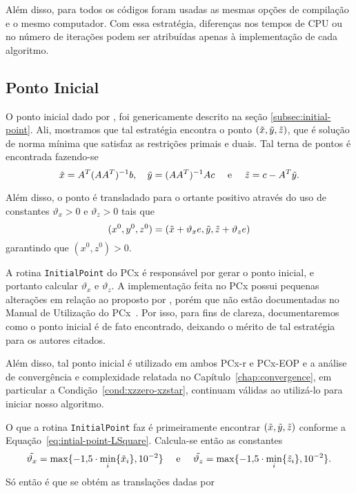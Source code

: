 Além disso, para todos os códigos foram usadas as mesmas opções de compilação e o mesmo computador. Com essa estratégia, diferenças nos tempos de CPU ou no número de iterações podem ser atribuídas apenas à implementação de cada algoritmo.
\subsection{Ponto Inicial}

O ponto inicial dado por \textcite{Mehrotra:1992wr}, foi genericamente descrito na seção \ref{subsec:initial-point}. Ali, mostramos que tal estratégia encontra o ponto $(\tilde{x},\tilde{y},\tilde{z})$, que é solução de norma mínima que satisfaz as restrições primais e
duais. Tal terna de pontos é encontrada fazendo-se
\begin{equation}
	\label{eq:intial-point-LSquare}
	\tilde{x} = A^T(AA^T)^{-1}b, \quad \tilde{y} = (AA^T)^{-1}Ac\quad \text{ e }
\quad \tilde{z} = c - A^T\tilde{y}.
\end{equation}

Além disso, o ponto é transladado para o ortante positivo 
através do uso de constantes  $\vartheta_x>0$ e $\vartheta_ z>0$ tais que  
\begin{equation}
	\label{eq:intial-point-generated}
(x^0,y^0,z^0) = (\tilde{x}+ \vartheta_x e,\tilde{y},\tilde{z}+\vartheta_z e)
\end{equation}
garantindo que $(x^0,z^0)>0$.


 A rotina \verb|InitialPoint| do PCx é responsável por gerar o ponto inicial, e portanto calcular  $\vartheta_x$ e $\vartheta_ z$. A implementação feita no PCx possui  pequenas alterações em relação ao proposto por \citeauthor{Mehrotra:1992wr}, porém que não  estão documentadas no Manual de Utilização do PCx~\cite{Czyzyk:1998vw}. Por isso, para fins de clareza, documentaremos como o ponto inicial é de fato encontrado, deixando o mérito de tal estratégia para os autores citados.

  Além disso, tal ponto inicial é utilizado em ambos PCx-r e PCx-EOP e a análise de convergência e complexidade relatada no Capítulo~\ref{chap:convergence}, em particular a Condição~\ref{cond:xzzero-xzstar}, continuam válidas ao utilizá-lo para iniciar nosso algoritmo.

O que a rotina  \verb|InitialPoint| faz é primeiramente encontrar  $(\tilde{x},\tilde{y},\tilde{z})$ conforme a Equação~\eqref{eq:intial-point-LSquare}. Calcula-se então  as constantes
\begin{equation}
	\label{eq:initial-point-tilde-var}
\tilde{\vartheta_x} = \max\{\displaystyle\num{-1.5}\cdot\min_{i}\{\tilde{x}_{i}\},\num{e-2}\} \quad \text{ e }\quad  \tilde{\vartheta_z} = \max\{\displaystyle\num{-1.5}\cdot\min_{i}\{\tilde{z}_{i}\},\num{e-2}\}.
\end{equation}
Só então é que se obtém as translações dadas por 

